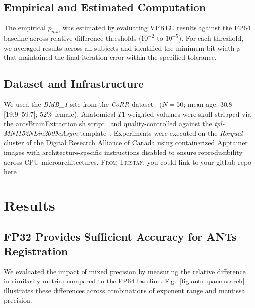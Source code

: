 \documentclass[journal,twoside,web]{ieeecolor}
\newcommand{\TG}[1]{\color{blue}\textsc{From Tristan: }#1\color{black}}
\begin{document}
\subsection{Empirical and Estimated Computation}
The empirical $p_{min}$ was estimated by evaluating VPREC results against the FP64 baseline across relative difference thresholds ($10^{-2}$ to $10^{-5}$). For each threshold, we averaged results across all subjects and identified the minimum bit-width $p$ that maintained the final iteration error within the specified tolerance.

\subsection{Dataset and Infrastructure}
We used the \textit{BMB\_1} site from the \textit{CoRR}
dataset~\cite{Zuo2014-ub} ($N=50$; mean age: $30.8$ [19.9--59.7]; $52\%$
female). Anatomical $T1$-weighted volumes were skull-stripped via the
antsBrainExtraction.sh script~\cite{Avants2020-xx,ANTs2023-du} and
quality-controlled against the \textit{tpl-MNI152NLin2009cAsym}
template~\cite{Ciric2022-mb}. Experiments were executed on the \textit{Rorqual}
cluster of the Digital Research Alliance of Canada using containerized Apptainer
images with architecture-specific instructions disabled to ensure
reproducibility across CPU microarchitectures. \TG{you could link to your github repo here}

\section{Results}
\label{sec:results}

\subsection{FP32 Provides Sufficient Accuracy for ANTs Registration}
We evaluated the impact of mixed precision by measuring the relative difference in similarity metrics compared to the FP64 baseline. Fig.~\ref{fig:ants-space-search} illustrates these differences across combinations of exponent range and mantissa precision.
\end{document}
